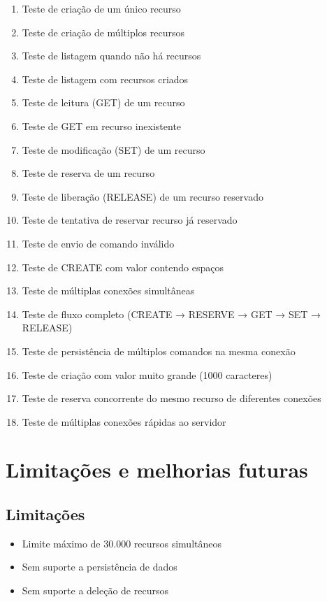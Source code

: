 \documentclass{article}
\begin{document}
\begin{enumerate}
    \item Teste de criação de um único recurso
    \item Teste de criação de múltiplos recursos
    \item Teste de listagem quando não há recursos
    \item Teste de listagem com recursos criados
    \item Teste de leitura (GET) de um recurso
    \item Teste de GET em recurso inexistente
    \item Teste de modificação (SET) de um recurso
    \item Teste de reserva de um recurso
    \item Teste de liberação (RELEASE) de um recurso reservado
    \item Teste de tentativa de reservar recurso já reservado
    \item Teste de envio de comando inválido
    \item Teste de CREATE com valor contendo espaços
    \item Teste de múltiplas conexões simultâneas
    \item Teste de fluxo completo (CREATE → RESERVE → GET → SET → RELEASE)
    \item Teste de persistência de múltiplos comandos na mesma conexão
    \item Teste de criação com valor muito grande (1000 caracteres)
    \item Teste de reserva concorrente do mesmo recurso de diferentes conexões
    \item Teste de múltiplas conexões rápidas ao servidor
\end{enumerate}

\section{Limitações e melhorias futuras}

\subsection{Limitações}

\begin{itemize}
    \item Limite máximo de 30.000 recursos simultâneos
    \item Sem suporte a persistência de dados
	\item Sem suporte a deleção de recursos
\end{itemize}
\end{document}
